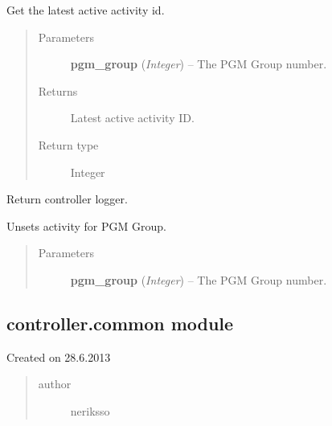 \documentclass[letterpaper,10pt,english]{sphinxmanual}
\begin{document}

\begin{fulllineitems}
\label{controller:controller.activity.get_active_activity}
Get the latest active activity id.
\begin{quote}\begin{description}
\item[{Parameters}] \leavevmode
\textbf{pgm\_group} (\emph{Integer}) -- The PGM Group number.

\item[{Returns}] \leavevmode
Latest active activity ID.

\item[{Return type}] \leavevmode
Integer

\end{description}\end{quote}

\end{fulllineitems}


\begin{fulllineitems}
\label{controller:controller.activity.logger}
Return controller logger.

\end{fulllineitems}


\begin{fulllineitems}
\label{controller:controller.activity.unset_activity}
Unsets activity for PGM Group.
\begin{quote}\begin{description}
\item[{Parameters}] \leavevmode
\textbf{pgm\_group} (\emph{Integer}) -- The PGM Group number.

\end{description}\end{quote}

\end{fulllineitems}



\subsection{controller.common module}
\label{controller:module-controller.common}\label{controller:controller-common-module}
Created on 28.6.2013
\begin{quote}\begin{description}
\item[{author}] \leavevmode
neriksso

\end{description}\end{quote}
\end{document}
